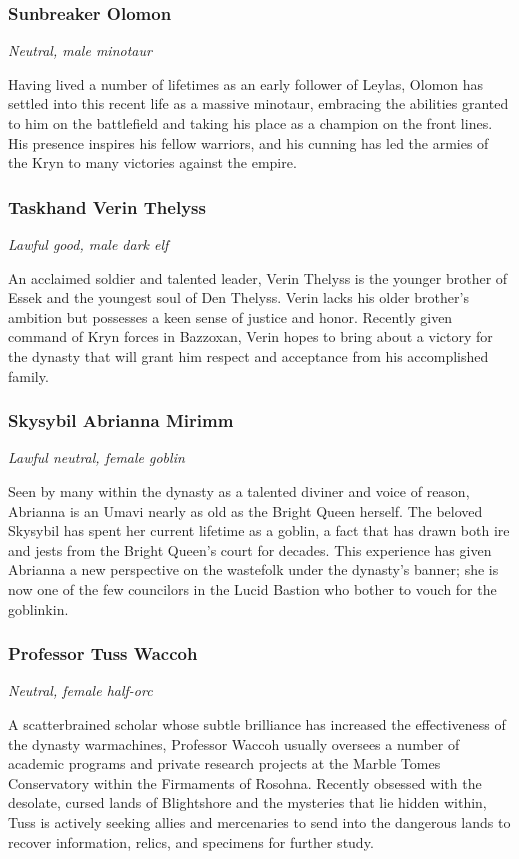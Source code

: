 \documentclass[10pt,a4paper,twoside,bg=print,twocolumn,openany,nodeprecatedcode]{dndbook}
\begin{document}
\subsubsection{Sunbreaker Olomon}
\textit{Neutral, male minotaur}

Having lived a number of lifetimes as an early follower of Leylas, Olomon has settled into this recent life as a massive minotaur, embracing the abilities granted to him on the battlefield and taking his place as a champion on the front lines. His presence inspires his fellow warriors, and his cunning has led the armies of the Kryn to many victories against the empire.

\subsubsection{Taskhand Verin Thelyss}
\textit{Lawful good, male dark elf}

An acclaimed soldier and talented leader, Verin Thelyss is the younger brother of Essek and the youngest soul of Den Thelyss. Verin lacks his older brother's ambition but possesses a keen sense of justice and honor. Recently given command of Kryn forces in Bazzoxan, Verin hopes to bring about a victory for the dynasty that will grant him respect and acceptance from his accomplished family.

\subsubsection{Skysybil Abrianna Mirimm}
\textit{Lawful neutral, female goblin}

Seen by many within the dynasty as a talented diviner and voice of reason, Abrianna is an Umavi nearly as old as the Bright Queen herself. The beloved Skysybil has spent her current lifetime as a goblin, a fact that has drawn both ire and jests from the Bright Queen's court for decades. This experience has given Abrianna a new perspective on the wastefolk under the dynasty's banner; she is now one of the few councilors in the Lucid Bastion who bother to vouch for the goblinkin.

\subsubsection{Professor Tuss Waccoh}
\textit{Neutral, female half-orc}

A scatterbrained scholar whose subtle brilliance has increased the effectiveness of the dynasty warmachines, Professor Waccoh usually oversees a number of academic programs and private research projects at the Marble Tomes Conservatory within the Firmaments of Rosohna. Recently obsessed with the desolate, cursed lands of Blightshore and the mysteries that lie hidden within, Tuss is actively seeking allies and mercenaries to send into the dangerous lands to recover information, relics, and specimens for further study.
\end{document}

